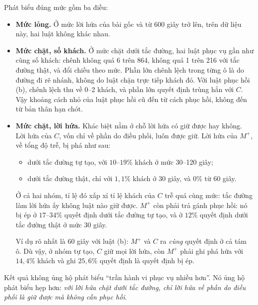 Phát biểu đúng mức gồm ba điều:
\begin{itemize}
\item \textbf{Mức lỏng.} Ở mức lời hứa của bài gốc và từ 600 giây trở lên, trên dữ liệu này, hai luật
không khác nhau.
\item \textbf{Mức chặt, số khách.} Ở mức chặt dưới tắc đường, hai luật phục vụ gần như cùng số khách:
chênh không quá 6 trên 864, không quá 1 trên 216 với tắc đường thật, và đổi chiều theo mức. Phần lớn chênh lệch trong từng ô là do đường đi rẽ
nhánh, không do luật chặn trực tiếp khách đó. Với luật phục hồi (b), chênh lệch thu về 0--2 khách, và
phần lớn quyết định trùng hẳn với $C$. Vậy khoảng cách nhỏ của luật phục hồi cũ đến từ cách phục hồi,
không đến từ bản thân hạn chót.
\item \textbf{Mức chặt, lời hứa.} Khác biệt nằm ở chỗ lời hứa có giữ được hay không. Lời hứa của $C$,
vốn chỉ về phần do điều phối, luôn được giữ. Lời hứa của $M^{+}$, về tổng độ trễ, bị phá như sau:
  \begin{itemize}
  \item dưới tắc đường tự tạo, với $10$--$19\%$ khách ở mức 30--120 giây;
  \item dưới tắc đường thật, chỉ với $1{,}1\%$ khách ở 30 giây, và $0\%$ từ 60 giây.
  \end{itemize}
Ở cả hai nhóm, tỉ lệ đó xấp xỉ tỉ lệ khách của $C$ trễ quá cùng mức: tắc đường làm lời hứa ấy không
luật nào giữ được. $M^{+}$ còn phải trả gánh phục hồi: nó bị ép ở $17$--$34\%$ quyết định dưới tắc đường
tự tạo, và ở $12\%$ quyết định dưới tắc đường thật ở mức 30 giây.

Ví dụ rõ nhất là 60 giây với luật (b): $M^{+}$ và $C$ ra \emph{cùng} quyết định ở cả tám ô. Dù vậy, ở
nhóm tự tạo, $C$ giữ mọi lời hứa, còn $M^{+}$ phải ghi phá hứa với $14{,}4\%$ khách và ghi $25{,}6\%$
quyết định là quyết định bị ép.
\end{itemize}

Kết quả không ủng hộ phát biểu ``trần hành vi phục vụ nhiều hơn''. Nó ủng hộ phát biểu hẹp hơn:
\emph{với lời hứa chặt dưới tắc đường, chỉ lời hứa về phần do điều phối là giữ được mà không cần
phục hồi}.

